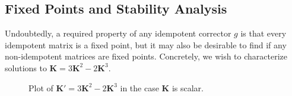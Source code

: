 \documentclass{article}
\theoremstyle{plain}
\theoremstyle{definition}
\theoremstyle{remark}
\newcommand{\vK}{\mathbf{K}}
\begin{document}
\subsection{Fixed Points and Stability Analysis}
Undoubtedly, a required property of any idempotent corrector $g$ is that every idempotent matrix is a fixed point, but it may also be desirable to find if any non-idempotent matrices are fixed points. Concretely, we wish to characterize solutions to $\vK = 3 \vK^2 - 2 \vK^3$.

\begin{figure}[h]
    \centering
    \caption{Plot of $\vK' = 3 \vK^2 - 2 \vK^3$ in the case $\vK$ is scalar.}
    \label{fig:plot-g}
\end{figure}
\end{document}
